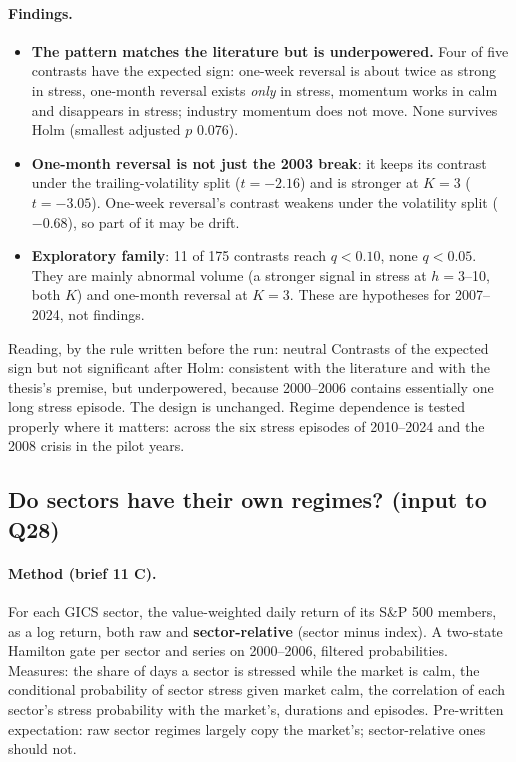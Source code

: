 \paragraph{Findings.}
\begin{itemize}
\item \textbf{The pattern matches the literature but is underpowered.} Four of five contrasts have the expected sign:
  one-week reversal is about twice as strong in stress, one-month reversal exists \emph{only} in stress, momentum
  works in calm and disappears in stress; industry momentum does not move. None survives Holm (smallest adjusted
  $p$ 0.076).
\item \textbf{One-month reversal is not just the 2003 break}: it keeps its contrast under the trailing-volatility
  split ($t=-2.16$) and is stronger at $K=3$ ($t=-3.05$). One-week reversal's contrast weakens under the volatility
  split ($-0.68$), so part of it may be drift.
\item \textbf{Exploratory family}: 11 of 175 contrasts reach $q<0.10$, none $q<0.05$. They are mainly abnormal volume
  (a stronger signal in stress at $h=3$--10, both $K$) and one-month reversal at $K=3$. These are hypotheses for
  2007--2024, not findings.
\end{itemize}

\begin{decbox}{Reading, by the rule written before the run: neutral}
Contrasts of the expected sign but not significant after Holm: consistent with the literature and with the
thesis's premise, but underpowered, because 2000--2006 contains essentially one long stress episode. The design is
unchanged. Regime dependence is tested properly where it matters: across the six stress episodes of 2010--2024 and
the 2008 crisis in the pilot years.
\end{decbox}

\subsection{Do sectors have their own regimes? (input to Q28)}

\paragraph{Method (brief 11 C).} For each GICS sector, the value-weighted daily return of its S\&P 500 members, as a
log return, both raw and \textbf{sector-relative} (sector minus index). A two-state Hamilton gate per sector and
series on 2000--2006, filtered probabilities. Measures: the share of days a sector is stressed while the market is
calm, the conditional probability of sector stress given market calm, the correlation of each sector's stress
probability with the market's, durations and episodes. Pre-written expectation: raw sector regimes largely copy the
market's; sector-relative ones should not.

